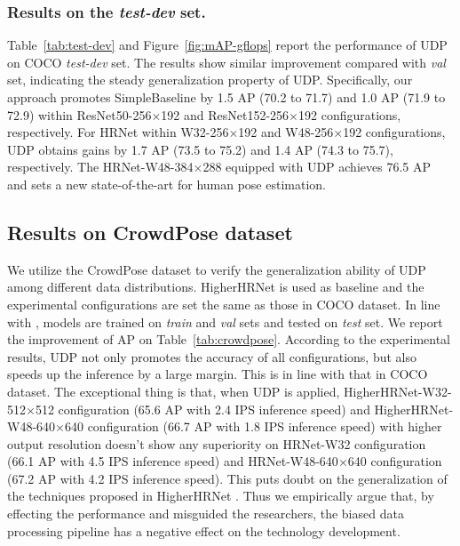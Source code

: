 \documentclass[10pt,journal,compsoc]{IEEEtran}
\begin{document}
\subsubsection{Results on the \textit{test-dev} set.} Table~\ref{tab:test-dev} and Figure~\ref{fig:mAP-gflops} report the performance of UDP on COCO \textit{test-dev} set. The results show similar improvement compared with \textit{val} set, indicating the steady generalization property of UDP. Specifically, our approach promotes SimpleBaseline by 1.5 AP (70.2 to 71.7) and 1.0 AP (71.9 to 72.9) within ResNet50-256$\times$192 and ResNet152-256$\times$192 configurations, respectively. For HRNet within W32-256$\times$192 and W48-256$\times$192 configurations, UDP obtains gains by 1.7 AP (73.5 to 75.2) and 1.4 AP (74.3 to 75.7), respectively. The HRNet-W48-384$\times$288 equipped with UDP achieves 76.5 AP and sets a new state-of-the-art for human pose estimation.

\subsection{Results on CrowdPose dataset}
We utilize the CrowdPose \cite{Crowdpose} dataset to verify the generalization ability of UDP among different data distributions. HigherHRNet \cite{Higher} is used as baseline and the experimental configurations are set the same as those in COCO dataset. In line with \cite{Higher}, models are trained on \textit{train} and \textit{val} sets and tested on \textit{test} set. We report the improvement of AP on Table~\ref{tab:crowdpose}. According to the experimental results, UDP not only promotes the accuracy of all configurations, but also speeds up the inference by a large margin. This is in line with that in COCO dataset. The exceptional thing is that, when UDP is applied, HigherHRNet-W32-512$\times$512 configuration (65.6 AP with 2.4 IPS inference speed) and HigherHRNet-W48-640$\times$640 configuration (66.7 AP with 1.8 IPS inference speed) with higher output resolution doesn't show any superiority on HRNet-W32 configuration (66.1 AP with 4.5 IPS inference speed) and HRNet-W48-640$\times$640 configuration (67.2 AP with 4.2 IPS inference speed). This puts doubt on the generalization of the techniques proposed in HigherHRNet \cite{Higher}. Thus we empirically argue that, by effecting the performance and misguided the researchers, the biased data processing pipeline has a negative effect on the technology development.
\end{document}
